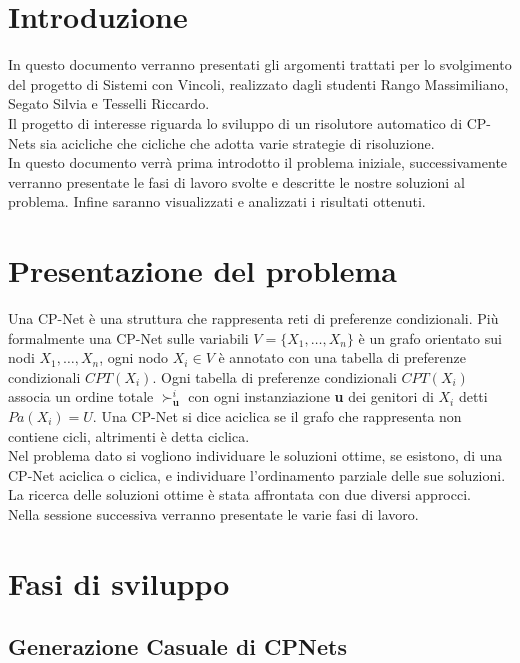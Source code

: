 \documentclass[a4paper,titlepage]{article}
\begin{document}
\tableofcontents

\newpage

\section{Introduzione}
In questo documento verranno presentati gli argomenti trattati per lo svolgimento del progetto di Sistemi con Vincoli, realizzato dagli studenti Rango Massimiliano, Segato Silvia e Tesselli Riccardo.\\Il progetto di interesse riguarda lo sviluppo di un risolutore automatico di CP-Nets sia acicliche che cicliche che adotta varie strategie di risoluzione.\\In questo documento verrà prima introdotto il problema iniziale, successivamente verranno presentate le fasi di lavoro svolte e descritte le nostre soluzioni al problema. Infine saranno visualizzati e analizzati i risultati ottenuti.

\section{Presentazione del problema}
Una CP-Net è una struttura che rappresenta reti di preferenze condizionali. Più formalmente una CP-Net sulle variabili $V = \{X_{1},\dots, X_{n}\}$ è un grafo orientato sui nodi $X_{1},\dots, X_{n}$, ogni nodo $X_{i} \in V$ è annotato con una tabella di preferenze condizionali $CPT(X_{i})$. Ogni tabella di preferenze condizionali $CPT(X_{i})$ associa un ordine totale $\succ^{i}_{\textbf{u}}$ con ogni instanziazione \textbf{u} dei genitori di $X_{i}$ detti $Pa(X_{i}) = U$. Una CP-Net si dice aciclica se il grafo che rappresenta non contiene cicli, altrimenti è detta ciclica.\\
Nel problema dato si vogliono individuare le soluzioni ottime, se esistono, di una CP-Net aciclica o ciclica, e individuare l'ordinamento parziale delle sue soluzioni. La ricerca delle soluzioni ottime è stata affrontata con due diversi approcci.\\Nella sessione successiva verranno presentate le varie fasi di lavoro.


\section{Fasi di sviluppo}

\subsection{Generazione Casuale di CPNets}
\end{document}
